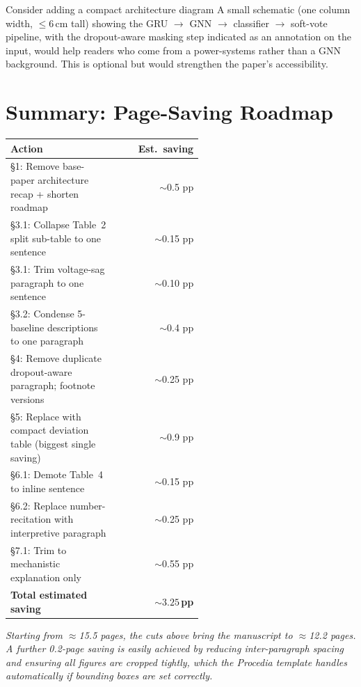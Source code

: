 \documentclass[11pt,a4paper]{article}
\begin{document}
\begin{suggestbox}{Consider adding a compact architecture diagram}
A small schematic (one column width, $\leq$6\,cm tall) showing the GRU $\to$
GNN $\to$ classifier $\to$ soft-vote pipeline, with the dropout-aware masking
step indicated as an annotation on the input, would help readers who come from
a power-systems rather than a GNN background. This is optional but would
strengthen the paper's accessibility.
\end{suggestbox}

\section{Summary: Page-Saving Roadmap}

\begin{tcolorbox}[colback=violet!6,colframe=trimviolet,
  fonttitle=\bfseries\color{trimviolet},
  title={Trimming Plan to Reach $\leq 12$ Pages}]

\begin{tabular}{p{0.55\linewidth}r}
\toprule
\textbf{Action} & \textbf{Est.\ saving} \\
\midrule
\S1: Remove base-paper architecture recap + shorten roadmap
  & $\sim$0.5 pp \\
\S3.1: Collapse Table~2 split sub-table to one sentence
  & $\sim$0.15 pp \\
\S3.1: Trim voltage-sag paragraph to one sentence
  & $\sim$0.10 pp \\
\S3.2: Condense 5-baseline descriptions to one paragraph
  & $\sim$0.4 pp \\
\S4: Remove duplicate dropout-aware paragraph; footnote versions
  & $\sim$0.25 pp \\
\S5: Replace with compact deviation table (biggest single saving)
  & $\sim$0.9 pp \\
\S6.1: Demote Table~4 to inline sentence
  & $\sim$0.15 pp \\
\S6.2: Replace number-recitation with interpretive paragraph
  & $\sim$0.25 pp \\
\S7.1: Trim to mechanistic explanation only
  & $\sim$0.55 pp \\
\midrule
\textbf{Total estimated saving} & $\mathbf{\sim 3.25}$\,\textbf{pp} \\
\bottomrule
\end{tabular}

\medskip
\textit{Starting from $\approx$15.5 pages, the cuts above bring the manuscript
to $\approx$12.2 pages. A further 0.2-page saving is easily achieved by reducing
inter-paragraph spacing and ensuring all figures are cropped tightly, which the
Procedia template handles automatically if bounding boxes are set correctly.}
\end{tcolorbox}
\end{document}
